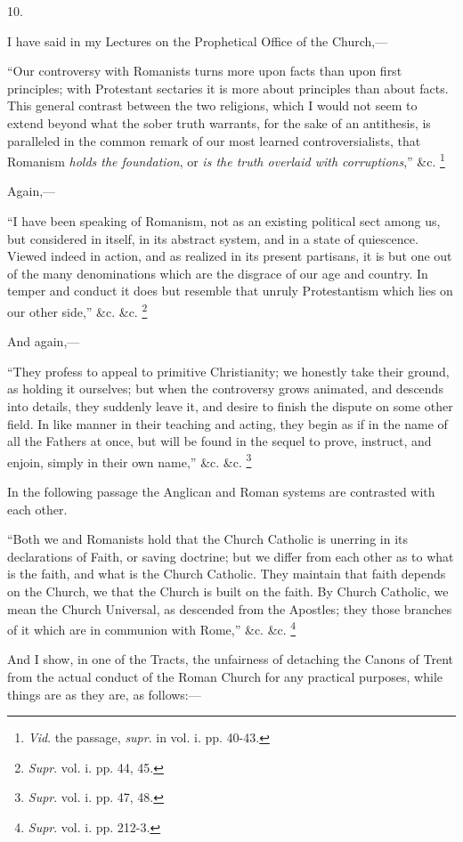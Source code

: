 10.

I have said in my Lectures on the Prophetical
Office of the Church,—

``Our
controversy with Romanists turns more upon facts than upon first
principles; with Protestant sectaries it is more about principles than
about facts. This general contrast between the two religions, which I
would not seem to extend beyond what the sober truth warrants, for the
sake of an antithesis, is paralleled in the common remark of our most
learned controversialists, that Romanism \emph{holds the foundation},
or \emph{is the truth overlaid with corruptions},'' \&c.
\footnote{\emph{Vid}. the passage, \emph{supr}. in vol. i. pp. 40-43.}

Again,—

``I
have been speaking of Romanism, not as an existing political sect
among us, but considered in itself, in its abstract system, and in a
state of quiescence. Viewed indeed in action, and as realized in its
present partisans, it is but one out of the many denominations which
are the disgrace of our age and country. In temper and conduct it does
but resemble that unruly Protestantism which lies on our other side,''
\&c. \&c. \footnote{\emph{Supr}. vol. i. pp. 44, 45.}

And again,—

``They
profess to appeal to primitive Christianity; we honestly take their
ground, as holding it ourselves; but when the controversy grows
animated, and descends into details, they suddenly leave it, and
desire to finish the dispute on some other field. In like manner in
their teaching and acting, they begin as if in the name of all the
Fathers at once, but will be found in the sequel to prove, instruct,
and enjoin, simply in their own name,'' \&c. \&c. \footnote{\emph{Supr}. vol. i. pp. 47, 48.}

In the following passage the Anglican and Roman
systems are contrasted with each other.

``Both
we and Romanists hold that the Church Catholic is unerring in its
declarations of Faith, or saving doctrine; but we differ from each
other as to what is the faith, and what is the Church Catholic. They
maintain that faith depends on the Church, we that the Church is built
on the faith. By Church Catholic, we mean the Church Universal, as
descended from the Apostles; they those branches of it which are in
communion with Rome,'' \&c. \&c. \footnote{\emph{Supr}. vol. i. pp. 212-3.}

And I show, in one of the Tracts, the unfairness
of detaching the Canons of Trent from the actual conduct of the Roman
Church for any practical purposes, while things are as they are, as
follows:—

